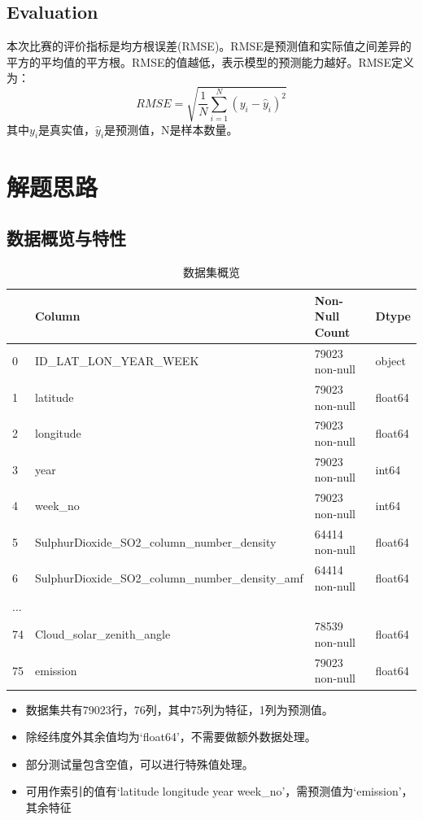 \documentclass[fontset=windows]{ctexart}
\begin{document}
\subsection{Evaluation}

本次比赛的评价指标是均方根误差(RMSE)。RMSE是预测值和实际值之间差异的平方的平均值的平方根。RMSE的值越低，表示模型的预测能力越好。RMSE定义为：$$RMSE=\sqrt{\frac{1}{N}\sum\limits_{i=1}^{N}(y_i-\hat y_i)^2}$$其中$y_i$是真实值，$\hat y_i$是预测值，N是样本数量。

\section{解题思路}

\subsection{数据概览与特性}

\begin{table}[h]
      \centering
      \begin{tabular}{|l|l|l|l|}
      \hline
          \ & Column & Non-Null Count & Dtype \\ \hline
          0 & ID\_LAT\_LON\_YEAR\_WEEK & 79023 non-null & object \\ \hline
          1 & latitude & 79023 non-null & float64 \\ \hline
          2 & longitude & 79023 non-null & float64 \\ \hline
          3 & year & 79023 non-null & int64 \\ \hline
          4 & week\_no & 79023 non-null & int64 \\ \hline
          5 & SulphurDioxide\_SO2\_column\_number\_density & 64414 non-null & float64 \\ \hline
          6 & SulphurDioxide\_SO2\_column\_number\_density\_amf & 64414 non-null & float64 \\ \hline
          ... & ~ & ~ & ~ \\ \hline
          74 & Cloud\_solar\_zenith\_angle & 78539 non-null & float64 \\ \hline
          75 & emission & 79023 non-null & float64 \\ \hline
      \end{tabular}
      \caption{数据集概览}
\end{table}

\begin{itemize}
      \item 数据集共有79023行，76列，其中75列为特征，1列为预测值。
      \item 除经纬度外其余值均为`float64'，不需要做额外数据处理。
      \item 部分测试量包含空值，可以进行特殊值处理。
      \item 可用作索引的值有`latitude longitude year week\_no'，需预测值为`emission'，其余特征
\end{itemize}
\end{document}
